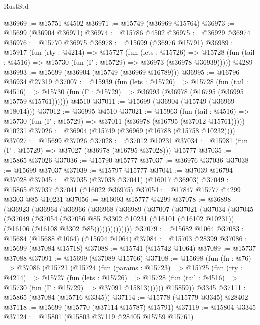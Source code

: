 \begin{lexlean}{RustStd}
\begin{coremodule}
@36969 := @15751 @4502
@36971 := @15749 (@36969 @15764)
@36973 := @15699 (@36904 @36971)
@36974 := @15786 @4502
@36975 := @36929 @36974
@36976 := @15770 @36975
@36978 := @15699 (@36976 @15791)
@36989 := @15917
    (fun (rty : @4214) =>
    @15727
      (fun (lets : @15726) =>
      @15728 (fun (tail : @4516) => @15730 (fun (Γ : @15729) => @36973 (@36978 @36939)))))
    @4289
@36993 := @15699 (@36904 (@15749 (@36969 @16789)))
@36995 := @16796 @36934 @27319
@37007 := @15939
    (fun (lets : @15726) =>
    @15728
      (fun (tail : @4516) =>
      @15730 (fun (Γ : @15729) => @36993 (@36978 (@16795 (@36995 @15759 @15761))))))
    @4510
@37011 := @15699 (@36904 (@15749 (@36969 @18014)))
@37012 := @36995 @4510
@37021 := @15963
    (fun (tail : @4516) => @15730 (fun (Γ : @15729) => @37011 (@36978 (@16795 (@37012 @15761)))))
    @10231
@37026 := @36904 (@15749 (@36969 (@16788 (@15758 @10232))))
@37027 := @15699 @37026
@37028 := @37012 @10231
@37034 := @15981 (fun (Γ : @15729) => @37027 (@36978 (@16795 @37028))) @15777
@37035 := @15865 @37026
@37036 := @15790 @15777
@37037 := @36976 @37036
@37038 := @15699 @37037
@37039 := @15797 @15777
@37041 := @37039 @16794 @37028
@37045 := @37035 (@37038 @37041) (@16017 @36903)
@37049 := @15865 @37037 @37041 (@16022 @36975)
@37054 := @17847 @15777 @4299 @3303 @85 @10231
@37056 := @16093 @15777 @4299
@37078 := @36898
    (@36923
      (@36964
        (@36966
          (@36968
            (@36989
              (@37007
                (@37021
                  (@37034
                    (@37045
                      (@37049
                        (@37054
                          (@37056
                            @85
                            @3302
                            @10231
                            (@16101 (@16102 @10231))
                            (@16106 (@16108 @3302 @85))))))))))))))
@37079 := @15682 @1064
@37083 := @15684 (@15688 @1064) (@15694 @1064)
@37084 := @15703 @28399
@37086 := @15699 (@37084 @15718)
@37088 := @15741 (@15742 @1064)
@37089 := @15737 @37088
@37091 := @15699 (@37089 @15766)
@37108 := @15698
    (fun (fn : @76) =>
    @37086
      (@15721
        (@15724
          (fun (params : @15723) =>
          @15725
            (fun (rty : @4214) =>
            @15727
              (fun (lets : @15726) =>
              @15728 (fun (tail : @4516) => @15730 (fun (Γ : @15729) => @37091 @15813))))))
        @15859))
    @3345
@37111 := @15865 (@37084 (@15716 @3345))
@37114 := @15778 (@15779 @3345) @28402
@37118 := @15699 (@15770 (@37114 @15787) @15791)
@37119 := @15804 @3345
@37124 := @15801 (@15803 @37119 @28405 @15759 @15761)

\end{coremodule}
\end{lexlean}
